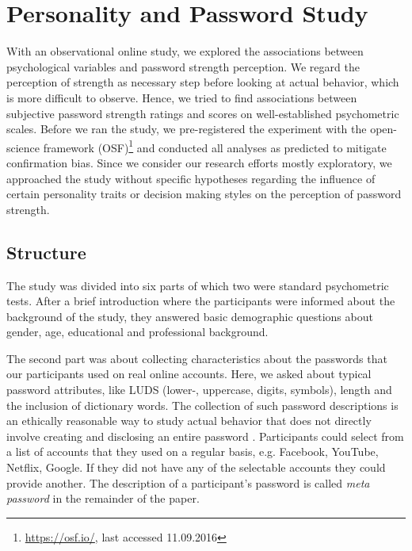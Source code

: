 \section{Personality and Password Study}
With an observational online study, we explored the associations between psychological variables and password strength perception. We regard the perception of strength as necessary step before looking at actual behavior, which is more difficult to observe. Hence, we tried to find associations between subjective password strength ratings and scores on well-established psychometric scales. Before we ran the study, we pre-registered the experiment with the open-science framework (OSF)\footnote{\url{https://osf.io/}, last accessed 11.09.2016} and conducted all analyses as predicted to mitigate confirmation bias. Since we consider our research efforts mostly exploratory, we approached the study without specific hypotheses regarding the influence of certain personality traits or decision making styles on the perception of password strength.

\subsection{Structure}
The study was divided into six parts of which two were standard psychometric tests. After a brief introduction where the participants were informed about the background of the study, they answered basic demographic questions about gender, age, educational and professional background. %

The second part was about collecting characteristics about the passwords that our participants used on real online accounts. Here, we asked about typical password attributes, like LUDS (lower-, uppercase, digits, symbols), length and the inclusion of dictionary words. The collection of such password descriptions is an ethically reasonable way to study actual behavior that does not directly involve creating and disclosing an entire password \cite{VonZezschwitz2013SurvivalShortest}. Participants could select from a list of accounts that they used on a regular basis, e.g. Facebook, YouTube, Netflix, Google. If they did not have any of the selectable accounts they could provide another. The description of a participant's password is called \textit{meta password} in the remainder of the paper. 


